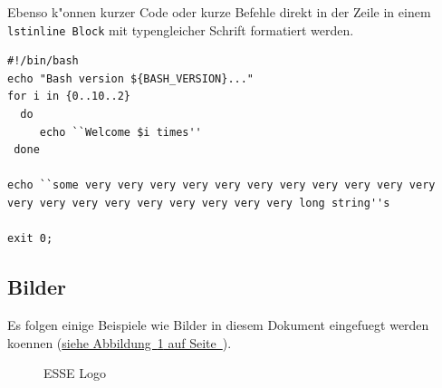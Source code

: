\documentclass[12pt,a4paper,titlepage,oneside]{scrartcl}
\begin{document}
Ebenso k"onnen kurzer Code oder kurze Befehle direkt in der Zeile in einem \lstinline{lstinline Block} mit typengleicher Schrift formatiert werden.

%

\begin{lstlisting}[caption=Example bash script,label=code:beispiel2,style=simple]
#!/bin/bash
echo "Bash version ${BASH_VERSION}..."
for i in {0..10..2}
  do
     echo ``Welcome $i times''
 done

echo ``some very very very very very very very very very very very very very very very very very very very very long string''s

exit 0;
\end{lstlisting}

\subsection{Bilder}

Es folgen einige Beispiele wie Bilder in diesem Dokument eingefuegt werden koennen
(\hyperref[fig:logo1]{siehe Abbildung~\ref*{fig:logo1} auf Seite~\pageref*{fig:logo1}}).

\begin{figure}[h!]
  \centering
  \caption{ESSE Logo}
  \label{fig:logo1}
\end{figure}
\end{document}
